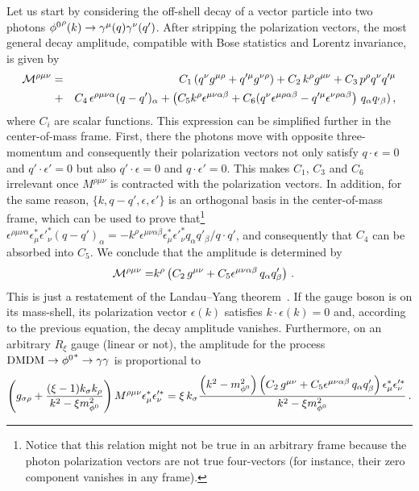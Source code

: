 Let us start by considering the off-shell decay of a vector particle into two photons ${\phi^0}^\rho (k) \to \gamma^\mu (q)\gamma^\nu (q')$. After stripping the polarization vectors, the most general  decay amplitude, compatible with Bose statistics and Lorentz invariance, is given by
%
\begin{eqnarray} 
{\cal M}^{\rho\mu\nu}=&&C_1\, (q^{\nu} g^{\mu\rho}+q'^{\mu} g^{\nu\rho})+C_2\, k^{\rho} g^{\mu\nu} +  C_3\, p^\rho q^{\nu}q'^{\mu}\nonumber\\
  +&&C_4\, \epsilon^{\rho\mu\nu\alpha}(q-q')_\alpha  +\left(  C_5 k^\rho  {\epsilon}^{ \mu \nu\alpha\beta} + C_6 (q^{\nu} {\epsilon}^{\mu\rho\alpha\beta} -q'^{\mu} {\epsilon}^{\nu\rho\alpha \beta}\right)\,q_{\alpha} q_{'\beta}  )\,,
\end{eqnarray}
%
where $C_i$ are scalar functions. This expression can be simplified further in the center-of-mass frame. First, there the photons move with opposite three-momentum  and consequently their polarization vectors not only satisfy  $q\cdot \epsilon=0$ and $q'\cdot \epsilon'=0$ but also  $q'\cdot \epsilon=0$ and $q\cdot \epsilon'=0$. This makes $C_1$, $C_3$ and $C_6$ irrelevant once $M^{\rho\mu\nu}$ is contracted with the polarization vectors. In addition, for the same reason, $\{k,q-q',\epsilon,\epsilon'\}$ is an orthogonal basis in the center-of-mass frame, which can be used to prove that\footnote{ Notice that this  relation might not be true in an arbitrary frame because the photon polarization vectors are not true four-vectors (for instance, their zero component vanishes in any frame).} $\epsilon^{\rho\mu\nu\alpha} \epsilon^*_{\mu}\epsilon'^*_{\nu}(q-q')_\alpha  = - k^\rho  {\epsilon}^{ \mu \nu\alpha\beta} \epsilon^*_{\mu}\epsilon'^*_{\nu}q_{\alpha} q'_{\beta} /q\cdot q' $, and consequently that $C_4$ can be absorbed into $C_5$. We conclude that the amplitude is determined by
%  
\begin{eqnarray} 
{\cal M}^{\rho\mu\nu}=& k^\rho \left( C_2\,  g^{\mu\nu} + C_5 {\epsilon}^{ \mu \nu\alpha\beta} \,q_{\alpha} q'_{\beta}  \right)\,.
\end{eqnarray}
%
This is just  a restatement of the Landau--Yang theorem~\cite{Landau,Yang:1950rg}. If the gauge boson is on its mass-shell, its polarization vector $\epsilon(k)$ satisfies $k \cdot \epsilon(k) =0$ and, according to the previous equation, the decay amplitude vanishes. Furthermore, on an arbitrary $R_\xi$ gauge (linear or not), the amplitude for the process $\text{DM}\text{DM}\to{\phi^0}^*\to\gamma\gamma$ is proportional to
%
\begin{align}
\left(g_{\sigma\rho}+\frac{ (\xi-1) k_\sigma k_\rho}{k^2-\xi m_{\phi^0}^2} \right) M^{\rho\mu\nu} \epsilon^*_{\mu}\epsilon'^*_{\nu}
=\xi \, k_\sigma \frac{\left(k^2- m_{\phi^0}^2\right)\left( C_2\,  g^{\mu\nu} + C_5 {\epsilon}^{ \mu \nu\alpha\beta} \,q_{\alpha} q'_{\beta}  \right)\epsilon^*_{\mu}\epsilon'^*_{\nu}}{k^2-\xi m_{\phi^0}^2}  \,.
\end{align}
